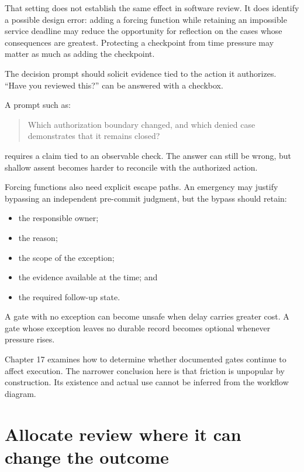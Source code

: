 That setting does not establish the same effect in software review. It does identify a possible design error: adding a forcing function while retaining an impossible service deadline may reduce the opportunity for reflection on the cases whose consequences are greatest. Protecting a checkpoint from time pressure may matter as much as adding the checkpoint.

The decision prompt should solicit evidence tied to the action it authorizes. ``Have you reviewed this?'' can be answered with a checkbox.

A prompt such as:

\begin{quote}
Which authorization boundary changed, and which denied case demonstrates that it remains closed?
\end{quote}

requires a claim tied to an observable check. The answer can still be wrong, but shallow assent becomes harder to reconcile with the authorized action.


Forcing functions also need explicit escape paths. An emergency may justify bypassing an independent pre-commit judgment, but the bypass should retain:

\begin{itemize}
\tightlist
\item
  the responsible owner;
\item
  the reason;
\item
  the scope of the exception;
\item
  the evidence available at the time; and
\item
  the required follow-up state.
\end{itemize}

A gate with no exception can become unsafe when delay carries greater cost. A gate whose exception leaves no durable record becomes optional whenever pressure rises.

Chapter 17 examines how to determine whether documented gates continue to affect execution. The narrower conclusion here is that friction is unpopular by construction. Its existence and actual use cannot be inferred from the workflow diagram.

\hypertarget{allocate-review-where-it-can-change-the-outcome}{%
\section{Allocate review where it can change the outcome}\label{allocate-review-where-it-can-change-the-outcome}}

